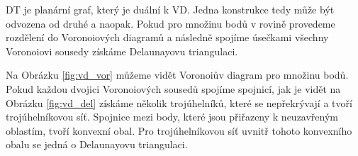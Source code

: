 \documentclass[12pt,a4paper]{article}
\begin{document}
DT je planární graf, který je duální k VD. Jedna konstrukce tedy může být odvozena od druhé a naopak. 
Pokud pro množinu bodů v rovině provedeme rozdělení do Voronoiových diagramů a následně spojíme úsečkami všechny Voronoiovi sousedy získáme Delaunayovu triangulaci.

\begin{figure}[h!]
\centering
\begin{floatrow}
\end{floatrow}
\end{figure}

Na Obrázku \ref{fig:vd_vor} můžeme vidět Voronoiův diagram pro množinu bodů. Pokud každou dvojici Voronoiových sousedů spojíme spojnicí, jak je vidět na Obrázku \ref{fig:vd_del} získáme několik trojúhelníků, které se nepřekrývají a tvoří trojúhelníkovou síť. Spojnice mezi body, které jsou přiřazeny k neuzavřeným oblastím, tvoří konvexní obal. Pro trojúhelníkovou síť uvnitř tohoto konvexního obalu se jedná o Delaunayovu triangulaci.
\end{document}
